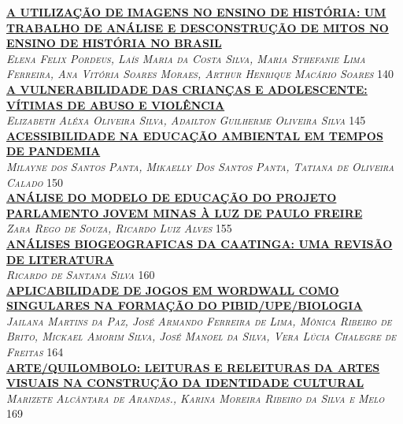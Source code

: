 \noindent \textsc{\hyperlink{trabalhos/251492.pdf.1}{\textbf{A UTILIZAÇÃO DE IMAGENS NO ENSINO DE HISTÓRIA: UM TRABALHO DE ANÁLISE E DESCONSTRUÇÃO DE MITOS NO ENSINO DE HISTÓRIA NO BRASIL}}}\\ 
\noindent \textsc{\textit{Elena Felix Pordeus, Laís Maria da Costa Silva, Maria Sthefanie Lima Ferreira, Ana Vitória Soares Moraes, Arthur Henrique Macário Soares}} \hfill 140\\ 

\noindent \textsc{\hyperlink{trabalhos/241030.pdf.1}{\textbf{A VULNERABILIDADE DAS CRIANÇAS E ADOLESCENTE: VÍTIMAS DE ABUSO E VIOLÊNCIA}}}\\ 
\noindent \textsc{\textit{Elizabeth Aléxa Oliveira Silva, Adailton Guilherme Oliveira Silva}} \hfill 145\\ 

\noindent \textsc{\hyperlink{trabalhos/249908.pdf.1}{\textbf{ACESSIBILIDADE NA EDUCAÇÃO AMBIENTAL EM TEMPOS DE PANDEMIA}}}\\ 
\noindent \textsc{\textit{Milayne dos Santos Panta, Mikaelly Dos Santos Panta, Tatiana de Oliveira Calado}} \hfill 150\\ 

\noindent \textsc{\hyperlink{trabalhos/245883.pdf.1}{\textbf{ANÁLISE DO MODELO DE EDUCAÇÃO DO PROJETO PARLAMENTO JOVEM MINAS À LUZ DE PAULO FREIRE}}}\\ 
\noindent \textsc{\textit{Zara Rego de Souza, Ricardo Luiz Alves}} \hfill 155\\ 

\noindent \textsc{\hyperlink{trabalhos/249594.pdf.1}{\textbf{ANÁLISES BIOGEOGRAFICAS DA CAATINGA: UMA REVISÃO DE LITERATURA}}}\\ 
\noindent \textsc{\textit{Ricardo de Santana Silva}} \hfill 160\\ 

\noindent \textsc{\hyperlink{trabalhos/251243.pdf.1}{\textbf{APLICABILIDADE DE JOGOS EM WORDWALL COMO SINGULARES NA FORMAÇÃO DO PIBID/UPE/BIOLOGIA}}}\\ 
\noindent \textsc{\textit{Jailana Martins da Paz, José Armando Ferreira de Lima, Mônica Ribeiro de Brito, Mickael Amorim Silva, José Manoel da Silva, Vera Lúcia Chalegre de Freitas}} \hfill 164\\ 

\noindent \textsc{\hyperlink{trabalhos/250230.pdf.1}{\textbf{ARTE/QUILOMBOLO: LEITURAS E RELEITURAS DA ARTES VISUAIS   NA CONSTRUÇÃO DA IDENTIDADE CULTURAL}}}\\ 
\noindent \textsc{\textit{Marizete Alcântara de Arandas., Karina Moreira Ribeiro da Silva e Melo}} \hfill 169\\ 

